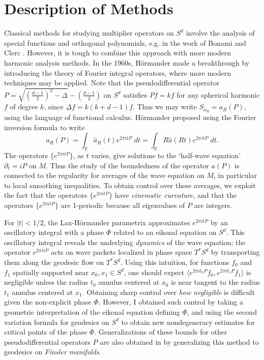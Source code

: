 \documentclass[11pt]{article}
\DeclareMathOperator{\RR}{\mathbb{R}}
\begin{document}
\section*{Description of Methods}

Classical methods for studying multiplier operators on $S^d$ involve the analysis of special functions and orthogonal polynomials, e.g. in the work of Bonami and Clerc \cite{BonamiClerc}. However, it is tough to combine this approach with more modern harmonic analysis methods. In the 1960s, H\"{o}rmander made a breakthrough by introducing the theory of Fourier integral operators, where more modern techniques may be applied. Note that the pseudodifferential operator $P = \sqrt{ ( {\scriptstyle \frac{d-1}{2} } )^2 - \Delta } - \left( {\scriptstyle \frac{d-1}{2}} \right)$ on $S^d$ satisfies $Pf = kf$ for any spherical harmonic $f$ of degree $k$, since $\Delta f = k(k+d-1) f$. Thus we may write $S_{a_R} = a_R(P)$, using the language of functional calculus. H\"{o}rmander proposed using the Fourier inversion formula to write
%
\[ a_R(P) = \int_{\RR} \widehat{a}_R(t) e^{2 \pi i t P}\; dt = \int_{\RR} R \widehat{a}(Rt) e^{2 \pi i t P}\; dt. \]
%
The operators $\{ e^{2 \pi i t P} \}$, as $t$ varies, give solutions to the `half-wave equation' $\partial_t = i P$ on $M$. Thus the study of the boundedness of the operator $a(P)$ is connected to the regularity for averages of the wave equation on $M$, in particular to local smoothing inequalities. To obtain control over these averages, we exploit the fact that the operators $\{ e^{2 \pi i t P} \}$ have \emph{cinematic curvature}, and that the operators $\{ e^{2 \pi i t P} \}$ are 1-periodic because all eigenvalues of $P$ are integers.

For $|t| < 1/2$, the Lax-H\"{o}rmander parametrix approximates $e^{2 \pi i t P}$ by an oscillatory integral with a phase $\Phi$ related to an eikonal equation on $S^d$. This oscillatory integral reveals the underlying \emph{dynamics} of the wave equation; the operator $e^{2 \pi i t P}$ acts on wave packets localized in phase space $T^* S^d$ by transporting them along the geodesic flow on $T^* S^d$. Using this intuition, for functions $f_0$ and $f_1$ spatially supported near $x_0,x_1 \in S^d$, one should expect $\langle e^{2 \pi i t_0 P} f_0, e^{2 \pi i t_1 P} f_1 \rangle$ is negligible unless the radius $t_0$ annulus centered at $x_0$ is near tangent to the radius $t_1$ annulus centered at $x_1$. Obtaining sharp control over \emph{how negligible} is difficult given the non-explicit phase $\Phi$. However, I obtained such control by taking a geometric interpretation of the eikonal equation defining $\Phi$, and using the second variation formula for geodesics on $S^d$ to obtain new nondegeneracy estimates for critical points of the phase $\Phi$. Generalizations of these bounds for other pseudodifferential operators $P$ are also obtained in \cite{DensonCharacterization} by generalizing this method to geodesics on \emph{Finsler manifolds}.
\end{document}
